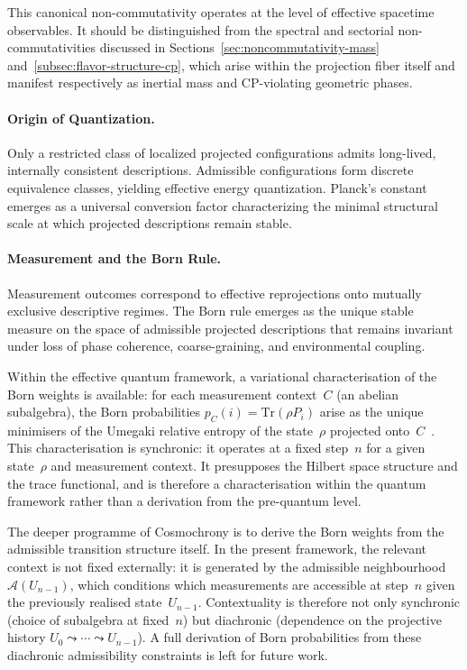     This canonical non-commutativity operates at the level of effective spacetime observables.
    It should be distinguished from the spectral and sectorial non-commutativities discussed in
    Sections~\ref{sec:noncommutativity-mass} and~\ref{subsec:flavor-structure-cp}, which arise within the projection
    fiber itself and manifest respectively as inertial mass and CP-violating geometric phases.

  \paragraph{Origin of Quantization.}
    \label{subsec:origin-of-quantization}
    Only a restricted class of localized projected configurations admits
    long-lived, internally consistent descriptions.
    Admissible configurations form discrete equivalence classes, yielding
    effective energy quantization.
    Planck's constant emerges as a universal conversion factor characterizing
    the minimal structural scale at which projected descriptions remain
    stable.

  \paragraph{Measurement and the Born Rule.}
    \label{subsec:measurement-and-the-born-rule}
    Measurement outcomes correspond to effective reprojections onto mutually
    exclusive descriptive regimes.
    The Born rule emerges as the unique stable measure on the space of
    admissible projected descriptions that remains invariant under loss of
    phase coherence, coarse-graining, and environmental coupling.

    Within the effective quantum framework, a variational characterisation of the
    Born weights is available: for each measurement context~$C$ (an abelian
    subalgebra), the Born probabilities $p_C(i) = \mathrm{Tr}(\rho P_i)$ arise as
    the unique minimisers of the Umegaki relative entropy of the state~$\rho$
    projected onto~$C$~\cite{Zaghi2025}.
    This characterisation is synchronic: it operates at a fixed step~$n$ for a
    given state~$\rho$ and measurement context.
    It presupposes the Hilbert space structure and the trace functional, and is
    therefore a characterisation within the quantum framework rather than a
    derivation from the pre-quantum level.

    The deeper programme of Cosmochrony is to derive the Born weights from the
    admissible transition structure itself.
    In the present framework, the relevant context is not fixed externally: it
    is generated by the admissible neighbourhood~$\mathcal{A}(U_{n-1})$, which
    conditions which measurements are accessible at step~$n$ given the
    previously realised state~$U_{n-1}$.
    Contextuality is therefore not only synchronic (choice of subalgebra at
    fixed~$n$) but diachronic (dependence on the projective history
    $U_0 \leadsto \cdots \leadsto U_{n-1}$).
    A full derivation of Born probabilities from these diachronic admissibility
    constraints is left for future work.

